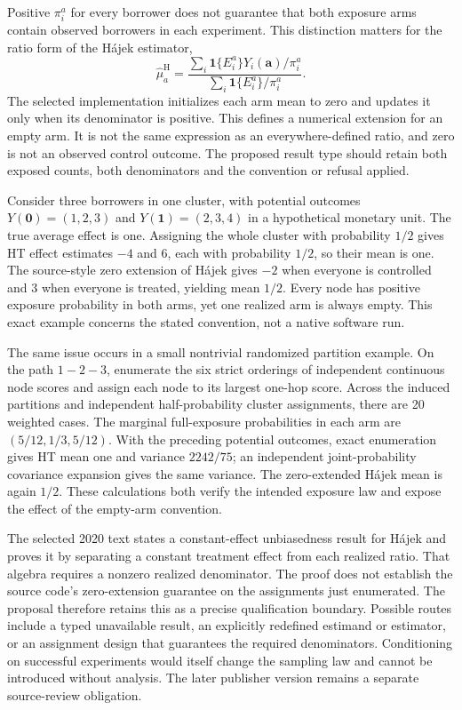 Positive $\pi_i^a$ for every borrower does not guarantee that both exposure arms contain observed borrowers in each experiment. This distinction matters for the ratio form of the H\'ajek estimator,
\[
 \widehat\mu_a^{\mathrm{H}}=
 \frac{\sum_i\mathbf{1}\{E_i^a\}Y_i(\mathbf a)/\pi_i^a}
      {\sum_i\mathbf{1}\{E_i^a\}/\pi_i^a}.
\]
The selected implementation initializes each arm mean to zero and updates it only when its denominator is positive. This defines a numerical extension for an empty arm. It is not the same expression as an everywhere-defined ratio, and zero is not an observed control outcome. The proposed result type should retain both exposed counts, both denominators and the convention or refusal applied.~\citep{exec25_cnet_rgcr,exec25_cnet_choice}

Consider three borrowers in one cluster, with potential outcomes $Y(\mathbf0)=(1,2,3)$ and $Y(\mathbf1)=(2,3,4)$ in a hypothetical monetary unit. The true average effect is one. Assigning the whole cluster with probability $1/2$ gives HT effect estimates $-4$ and $6$, each with probability $1/2$, so their mean is one. The source-style zero extension of H\'ajek gives $-2$ when everyone is controlled and $3$ when everyone is treated, yielding mean $1/2$. Every node has positive exposure probability in both arms, yet one realized arm is always empty. This exact example concerns the stated convention, not a native software run.~\citep{exec25_cnet_choice}

The same issue occurs in a small nontrivial randomized partition example. On the path $1-2-3$, enumerate the six strict orderings of independent continuous node scores and assign each node to its largest one-hop score. Across the induced partitions and independent half-probability cluster assignments, there are 20 weighted cases. The marginal full-exposure probabilities in each arm are $(5/12,1/3,5/12)$. With the preceding potential outcomes, exact enumeration gives HT mean one and variance $2242/75$; an independent joint-probability covariance expansion gives the same variance. The zero-extended H\'ajek mean is again $1/2$. These calculations both verify the intended exposure law and expose the effect of the empty-arm convention.~\citep{exec25_cnet_choice}

The selected 2020 text states a constant-effect unbiasedness result for H\'ajek and proves it by separating a constant treatment effect from each realized ratio. That algebra requires a nonzero realized denominator. The proof does not establish the source code's zero-extension guarantee on the assignments just enumerated. The proposal therefore retains this as a precise qualification boundary. Possible routes include a typed unavailable result, an explicitly redefined estimand or estimator, or an assignment design that guarantees the required denominators. Conditioning on successful experiments would itself change the sampling law and cannot be introduced without analysis. The later publisher version remains a separate source-review obligation.~\citep{exec25_cnet_paper,exec25_cnet_choice}

